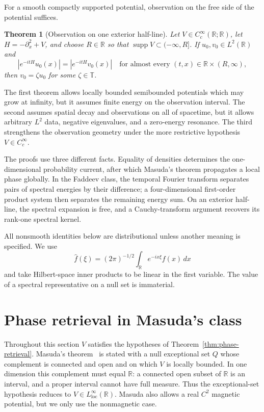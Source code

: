 \documentclass[11pt]{amsart}
\newtheorem{mainresult}{Theorem}
\numberwithin{equation}{section}
\theoremstyle{remark}
\newcommand{\R}{\mathbb R}
\newcommand{\T}{\mathbb T}
\begin{document}
For a smooth compactly supported potential, observation on the free side of
the potential suffices.

\begin{mainresult}[Observation on one exterior half-line]
\label{thm:half-line}
Let $V\in C_c^\infty(\R;\R)$, let $H=-\partial_x^2+V$, and choose
$R\in\R$ so that $\operatorname{supp}V\subset(-\infty,R]$.  If
$u_0,v_0\in L^2(\R)$ and
\[
 |e^{-itH}u_0(x)|=|e^{-itH}v_0(x)|
 \quad\text{for almost every }(t,x)\in\R\times(R,\infty),
\]
then $v_0=\zeta u_0$ for some $\zeta\in\T$.
\end{mainresult}

The first theorem allows locally bounded semibounded potentials which may
grow at infinity, but it assumes finite energy on the observation interval.
The second assumes spatial decay and observations on all of spacetime, but it
allows arbitrary $L^2$ data, negative eigenvalues, and a zero-energy
resonance.  The third strengthens the observation geometry under the more
restrictive hypothesis $V\in C_c^\infty$.

The proofs use three different facts.  Equality of densities determines the
one-dimensional probability current, after which Masuda's theorem propagates
a local phase globally.  In the Faddeev class, the temporal Fourier transform
separates pairs of spectral energies by their difference; a four-dimensional
first-order product system then separates the remaining energy sum.  On an
exterior half-line, the spectral expansion is free, and a Cauchy-transform
argument recovers its rank-one spectral kernel.

All nonsmooth identities below are distributional unless another meaning is
specified.  We use
\[
 \widehat f(\xi)=(2\pi)^{-1/2}\int_\R e^{-ix\xi}f(x)\,dx
\]
and take Hilbert-space inner products to be linear in the first variable.
The value of a spectral representative on a null set is immaterial.

\section{Phase retrieval in Masuda's class}\label{sec:masuda}

Throughout this section $V$ satisfies the hypotheses of
Theorem~\ref{thm:phase-retrieval}.  Masuda's theorem~\cite{Masuda} is stated
with a null exceptional set $Q$ whose complement is connected and open and on
which $V$ is locally bounded.  In one dimension this complement must equal
$\R$: a connected open subset of $\R$ is an interval, and a proper interval
cannot have full measure.  Thus the exceptional-set hypothesis reduces to
$V\in L^\infty_{\mathrm{loc}}(\R)$.  Masuda also allows a real $C^2$
magnetic potential, but we only use the nonmagnetic case.
\end{document}
